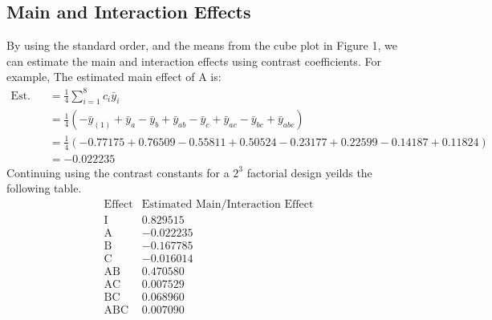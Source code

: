 \documentclass{article}
\begin{document}
\subsection{Main and Interaction Effects}
  By using the standard order, and the means from the cube plot in Figure 1, we can estimate the main and interaction effects using contrast coefficients.
  For example, The estimated main effect of A is:
  \begin{align*}
    \text{Est. Main Effect of A} &= \frac{1}{4} \sum_{i=1}^{8} c_i \bar{y}_i \\
                                &= \frac{1}{4} \left( -\bar{y}_{(1)} + \bar{y}_{a} - \bar{y}_{b} + \bar{y}_{ab} - \bar{y}_{c} + \bar{y}_{ac} - \bar{y}_{bc} + \bar{y}_{abc}\right) \\
                                &= \frac{1}{4} \left( -0.77175 + 0.76509 - 0.55811 + 0.50524 - 0.23177 + 0.22599 - 0.14187 + 0.11824\right) \\ 
                                &= -0.022235
  \end{align*}
  Continuing using the contrast constants for a $2^3$ factorial design yeilds the following table.
  \begin{equation*}
    \begin{array}{c|c}
        \text{Effect} & \text{Estimated Main/Interaction Effect} \\
        \hline
        \text{I}   & 0.829515 \\
        \text{A}   & -0.022235 \\
        \text{B}   & -0.167785 \\
        \text{C}   & -0.016014 \\
        \text{AB}  & 0.470580 \\
        \text{AC}  & 0.007529 \\
        \text{BC}  & 0.068960 \\
        \text{ABC} & 0.007090 \\
    
    \end{array}
    \end{equation*}\\
\end{document}
